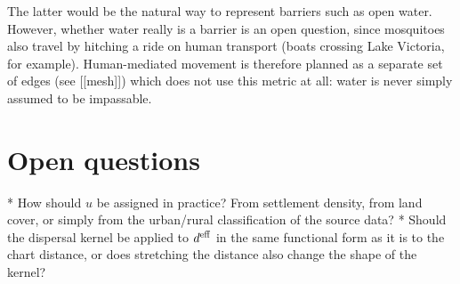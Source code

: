 	The latter would be the natural way to represent barriers such as open water. However, whether water really is a barrier is an open question, since mosquitoes also travel by hitching a ride on human transport (boats crossing Lake Victoria, for example). Human-mediated movement is therefore planned as a separate set of edges (see [[mesh]]) which does not use this metric at all: water is never simply assumed to be impassable.

\section{Open questions}

	* How should $u$ be assigned in practice? From settlement density, from land cover, or simply from the urban/rural classification of the source data?
	* Should the dispersal kernel be applied to $d^{\rm eff}$ in the same functional form as it is to the chart distance, or does stretching the distance also change the shape of the kernel?
